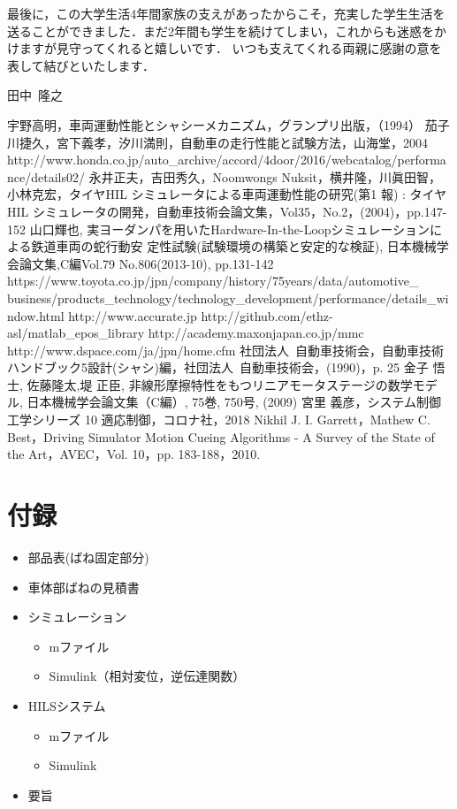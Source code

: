 \documentclass[a4paper,12pt]{article_vdlab_sotsuron}
\begin{document}
最後に，この大学生活4年間家族の支えがあったからこそ，充実した学生生活を送ることができました．まだ2年間も学生を続けてしまい，これからも迷惑をかけますが見守ってくれると嬉しいです．
いつも支えてくれる両親に感謝の意を表して結びといたします．


\begin{flushright}
    田中~隆之
\end{flushright}
\newpage
\begin{thebibliography}{99}
  宇野高明，車両運動性能とシャシーメカニズム，グランプリ出版，（1994）
  茄子川捷久，宮下義孝，汐川満則，自動車の走行性能と試験方法，山海堂，2004
  http://www.honda.co.jp/auto\_archive/accord/4door/2016/webcatalog/performance/details02/
  永井正夫，吉田秀久，Noomwongs Nuksit，横井隆，川眞田智，小林克宏，タイヤHIL シミュレータによる車両運動性能の研究(第1 報) : タイヤHIL シミュレータの開発，自動車技術会論文集，Vol35，No.2，(2004)，pp.147-152
  山口輝也, 実ヨーダンパを用いたHardware-In-the-Loopシミュレーションによる鉄道車両の蛇行動安
  定性試験(試験環境の構築と安定的な検証), 日本機械学会論文集,C編Vol.79 No.806(2013-10), pp.131-142
  https://www.toyota.co.jp/jpn/company/history/75years/data/automotive\_\\
  business/products\_technology/technology\_development/performance/details\_window.html
  http://www.accurate.jp
  http://github.com/ethz-asl/matlab\_epos\_library
  http://academy.maxonjapan.co.jp/mmc
  http://www.dspace.com/ja/jpn/home.cfm
  社団法人\ 自動車技術会，自動車技術ハンドブック5設計(シャシ)編，社団法人\ 自動車技術会，(1990)，p. 25
 金子 悟士, 佐藤隆太,堤 正臣, 非線形摩擦特性をもつリニアモータステージの数学モデル, 日本機械学会論文集（C編）, 75巻, 750号, (2009)
  宮里 義彦，システム制御工学シリーズ 10 適応制御，コロナ社，2018
  Nikhil J. I. Garrett，Mathew C. Best，Driving Simulator Motion Cueing Algorithms - A Survey of the State of the Art，AVEC，Vol. 10，pp. 183-188，2010.
\end{thebibliography}


\newpage
\section*{付録}
\begin{itemize}
\item 部品表(ばね固定部分)
\item 車体部ばねの見積書
\item シミュレーション
  \begin{itemize}
    \item mファイル
    \item Simulink（相対変位，逆伝達関数）
  \end{itemize}
\item HILSシステム
    \begin{itemize}
      \item mファイル
      \item Simulink
    \end{itemize}
\item 要旨
\end{itemize}
\end{document}
